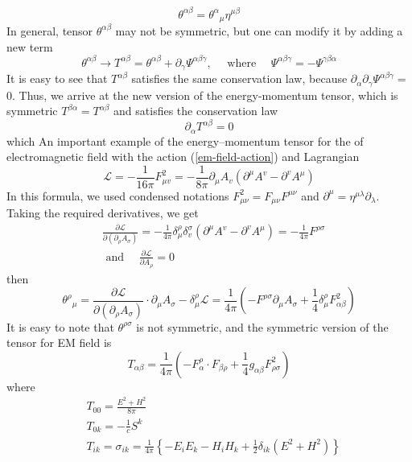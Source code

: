 \begin{equation}
\theta^{\alpha \beta}=\theta^{\alpha}{}_{\mu} \eta^{\mu \beta}
\end{equation}
In general, tensor $\theta^{\alpha \beta}$ may not be symmetric, but one can modify it by adding a new term
\begin{equation}
\theta^{\alpha \beta} \longrightarrow T^{\alpha \beta}=\theta^{\alpha \beta}+\partial_{\gamma} \Psi^{\alpha \beta \gamma}, \quad \text { where } \quad \Psi^{\alpha \beta \gamma}=-\Psi^{\gamma \beta \alpha}
\end{equation}
It is easy to see that $T^{\alpha \beta}$ satisfies the same conservation law, because $\partial_{\alpha} \partial_{\gamma} \Psi^{\alpha \beta \gamma}=$
0. Thus, we arrive at the new version of the energy-momentum tensor, which is symmetric $T^{\beta \alpha}=T^{\alpha \beta}$ and satisfies the conservation law
\begin{equation}
\partial_{\alpha} T^{\alpha \beta}=0
\end{equation}
which  An important example of the energy–momentum tensor for the of electromagnetic field with the action (\ref{em-field-action}) and Lagrangian
$$
\mathcal{L}=-\frac{1}{16 \pi} F_{\mu v}^{2}=-\frac{1}{8 \pi} \partial_{\mu} A_{v}\left(\partial^{\mu} A^{v}-\partial^{v} A^{\mu}\right)
$$
In this formula, we used condensed notations $F_{\mu \nu}^{2}=F_{\mu \nu} F^{\mu \nu}$ and $\partial^{\mu}=\eta^{\mu \lambda} \partial_{\lambda}$. Taking the required derivatives, we get
$$
\begin{aligned}
&\frac{\partial \mathcal{L}}{\partial\left(\partial_{\rho} A_{\sigma}\right)}=-\frac{1}{4 \pi} \delta_{\mu}^{\rho} \delta_{v}^{\sigma}\left(\partial^{\mu} A^{v}-\partial^{v} A^{\mu}\right)=-\frac{1}{4 \pi} F^{\rho \sigma}\\
&\text { and } \quad \frac{\partial \mathcal{L}}{\partial A_{\rho}}=0
\end{aligned}
$$
then
\begin{equation}
\theta^{\rho}{}_{ \mu}=\frac{\partial \mathcal{L}}{\partial\left(\partial_{\rho} A_{\sigma}\right)} \cdot \partial_{\mu} A_{\sigma}-\delta_{\mu}^{\rho} \mathcal{L}=\frac{1}{4 \pi}\left(-F^{\rho \sigma} \partial_{\mu} A_{\sigma}+\frac{1}{4} \delta_{\mu}^{\rho} F_{\alpha \beta}^{2}\right)
\end{equation}
It is easy to note that $\theta^{\rho \sigma}$ is not symmetric, and the symmetric version of the tensor for EM field is
\begin{equation}
T_{\alpha \beta}=\frac{1}{4 \pi}\left(-F_{\alpha}^{\rho} \cdot F_{\beta \rho}+\frac{1}{4} g_{\alpha \beta} F_{\rho \sigma}^{2}\right)
\end{equation}
where
\begin{equation}
\begin{aligned}
&T_{00}=\frac{E^{2}+H^{2}}{8 \pi}\\
&T_{0 k}=-\frac{1}{c} S^{k}\\
&T_{i k}=\sigma_{i k}=\frac{1}{4 \pi}\left\{-E_{i} E_{k}-H_{i} H_{k}+\frac{1}{2} \delta_{i k}\left(E^{2}+H^{2}\right)\right\}
\end{aligned}
\end{equation}

